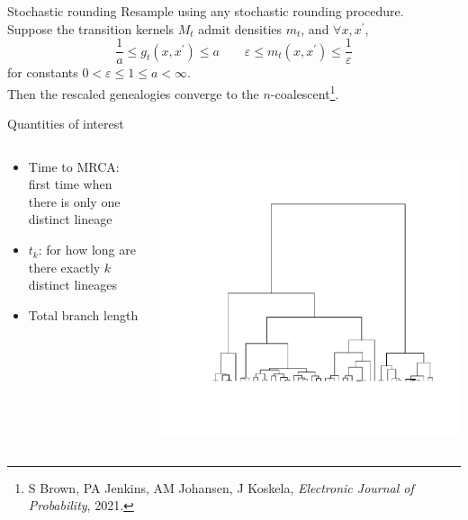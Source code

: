 \documentclass[aspectratio=169]{beamer}
\theoremstyle{definition}
\begin{document}
\begin{frame}{Stochastic rounding}
Resample using any stochastic rounding procedure.\\[10pt]
\pause
Suppose the transition kernels $M_t$ admit densities $m_t$, and $\forall x, x^\prime$,
\begin{equation*}
\frac{1}{a} \leq g_t(x, x^\prime) \leq a \qquad
\varepsilon \leq m_t(x, x^\prime) \leq \frac{1}{\varepsilon} 
\end{equation*}
for constants $0<\varepsilon\leq 1\leq a<\infty$.\\[10pt]
\pause
Then the rescaled genealogies converge to the $n$-coalescent\footnote{S Brown, PA Jenkins, AM Johansen, J Koskela,  \textit{Electronic Journal of Probability}, 2021.}.
\end{frame}


\begin{frame}{Quantities of interest}
\begin{columns}
\begin{column}{0.45\textwidth}
\begin{itemize}
\item Time to MRCA: first time when there is only one distinct lineage
\item $t_k$: for how long are there exactly $k$ distinct lineages
\item Total branch length
\end{itemize}
\end{column}
\begin{column}{0.45\textwidth}
\includegraphics[width=\textwidth, trim={2.8cm 3cm 1.5cm 2cm}, clip]{ncoalescent.pdf}
\end{column}
\end{columns}
\end{frame}
\end{document}
